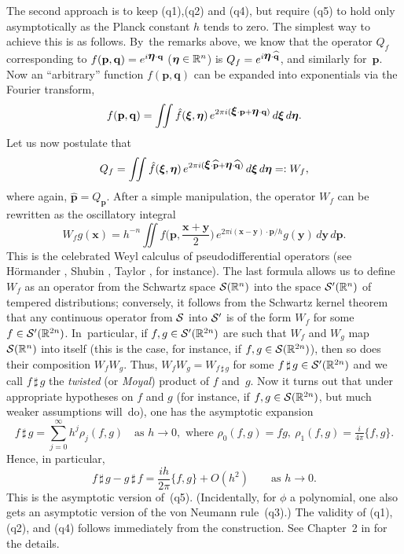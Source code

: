 \documentclass[11pt]{amsart}
\numberwithin{equation}{section}
\theoremstyle{remark}
\newcommand\RR{\mathbb R}
\newcommand{\bfeta}{\mbox{\boldmath $\eta$}}
\newcommand{\bxi}{\mbox{\boldmath $\xi$}}
\newcommand{\bp}{\mathbf p}
\newcommand{\bq}{\mathbf q}
\newcommand{\bx}{\mathbf x}
\newcommand{\by}{\mathbf y}
\begin{document}
The second approach is to keep (q1),(q2) and (q4), but require (q5) to hold
only asymptotically as the Planck constant $h$ tends to zero. The simplest way
to achieve this is as follows. By~the remarks above, we know that the operator
$Q_f$ corresponding to $f(\bp,\bq)=e^{i\bfeta\cdot \bq}$ ($\bfeta\in\RR^n$) is
$Q_f=e^{i\bfeta\cdot\widehat{\bq}}$, and similarly for~$\bp$.  Now an
``arbitrary'' function $f(\bp,\bq)$ can be expanded into exponentials via the
Fourier transform,
$$ f(\bp,\bq) = \iint \hat f(\bxi,\bfeta) \,
e^{2\pi i (\bxi\cdot \bp + \bfeta \cdot\bq)} \, d\bxi \, d\bfeta .  $$
Let us now postulate that
$$ Q_f = \iint \hat f(\bxi,\bfeta) \,
e^{2\pi i(\bxi\cdot\widehat{\bp} + \bfeta \cdot\widehat{\bq})} \, d\bxi \,
d\bfeta =: W_f,  $$
where again, $\widehat{\bp} = Q_\bp$.
After a simple manipulation, the operator $W_f$ can be rewritten as the
oscillatory integral
\begin{equation}  W_f g(\bx) = h^{-n} \iint f \Big(  \bp ,\frac{\bx+\by}2 \Big)
\, e^{2\pi i(\bx-\by)\cdot \bp /h}  g(\by) \, d\by \, d \bp  .
\label{tag:WEY}  \end{equation}
This is the celebrated Weyl calculus of pseudodifferential operators (see
H\"ormander \cite{bib:HormW}, Shubin \cite{bib:Shu}, Taylor \cite{bib:Tayl},
for instance). The last formula allows us to define $W_f$ as an operator from
the Schwartz space $\Cal S(\RR^n)$ into the space $\Cal S'(\RR^n)$ of tempered
distributions; conversely, it follows from the Schwartz kernel theorem that any
continuous operator from $\mathcal S$ into $\mathcal S'$ is of the form $W_f$ for some
$f\in\Cal S'(\RR^{2n})$. In~particular, if $f,g\in \Cal S'(\RR^{2n})$ are such
that $W_f$ and $W_g$ map $\Cal S(\RR^n)$ into itself (this is the case, for
instance, if $f,g\in\Cal S(\RR^{2n})$), then so does their composition
$W_f W_g$.  Thus, $W_f W_g=W_{f\,\sharp\, g}$ for some $f\,\sharp\, g\in\Cal
S'(\RR^{2n})$ and we  call $f\,\sharp\, g$ the {\sl twisted\/} (or {\sl
Moyal\/}) product of $f$ and~$g$. Now it turns out that under appropriate
hypotheses on $f$ and $g$ (for instance, if $f,g\in\Cal S(\RR^{2n})$, but much
weaker assumptions will~do), one has the asymptotic expansion
\begin{equation}  f\,\sharp\, g = \sum_{j=0}^\infty h^j \rho_j(f,g)
\quad\text{as }h\to0,
\text{ where }\rho_0(f,g)=fg,\ \rho_1(f,g)= \tfrac i{4\pi}\{f,g\}.
\label{tag:MOY} \end{equation}
Hence, in particular,
\begin{equation}  f\,\sharp\, g - g\,\sharp\, f = \frac{ih}{2\pi} \{f,g\} +
O(h^2) \qquad\text{as }h\to0.  \label{tag:AS}  \end{equation}
This is the asymptotic version of~(q5). (Incidentally, for $\phi$ a polynomial,
one also gets an asymptotic version of the von Neumann rule~(q3).) The validity
of (q1), (q2), and (q4) follows immediately from the construction. See
Chapter~2 in \cite{bib:Foll} for the details.
\end{document}
